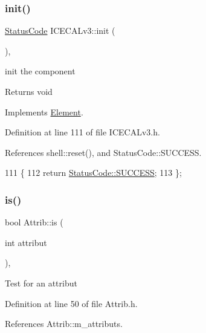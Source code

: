 \subsubsection{\texorpdfstring{init()}{init()}}
{\footnotesize\ttfamily \hyperlink{classStatusCode}{Status\+Code} I\+C\+E\+C\+A\+Lv3\+::init (\begin{DoxyParamCaption}{ }\end{DoxyParamCaption})\hspace{0.3cm}{\ttfamily [inline]}, {\ttfamily [virtual]}}

init the component

\begin{DoxyReturn}{Returns}
void 
\end{DoxyReturn}


Implements \hyperlink{classElement_af42754b5cabc198869222725218d695c}{Element}.



Definition at line 111 of file I\+C\+E\+C\+A\+Lv3.\+h.



References shell\+::reset(), and Status\+Code\+::\+S\+U\+C\+C\+E\+SS.


\begin{DoxyCode}
111                     \{
112     \textcolor{keywordflow}{return} \hyperlink{classStatusCode_a6f565cbeadc76d14c72f047e5e85eb4badd0da38d3ba0d922efd1f4619bc37ad8}{StatusCode::SUCCESS};
113   \};
\end{DoxyCode}
\mbox{\label{classAttrib_a704f26af560909ad22065083bb7d4c34}} 
\subsubsection{\texorpdfstring{is()}{is()}}
{\footnotesize\ttfamily bool Attrib\+::is (\begin{DoxyParamCaption}\item[{int}]{attribut }\end{DoxyParamCaption})\hspace{0.3cm}{\ttfamily [inline]}, {\ttfamily [inherited]}}

Test for an attribut 

Definition at line 50 of file Attrib.\+h.



References Attrib\+::m\+\_\+attributs.



